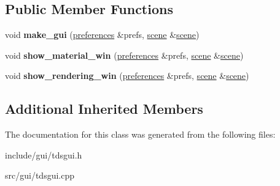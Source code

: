 \subsection*{Public Member Functions}
\begin{DoxyCompactItemize}
\item 
\mbox{\label{classtds__gui_aeef0820d048e0ddae1746a3827f214aa}} 
void {\bfseries make\+\_\+gui} (\hyperlink{classpreferences}{preferences} \&prefs, \hyperlink{classscene}{scene} \&\hyperlink{classscene}{scene})
\item 
\mbox{\label{classtds__gui_acc096c8c649a262775502514f101001a}} 
void {\bfseries show\+\_\+material\+\_\+win} (\hyperlink{classpreferences}{preferences} \&prefs, \hyperlink{classscene}{scene} \&\hyperlink{classscene}{scene})
\item 
\mbox{\label{classtds__gui_ae161ae22a1916dcd0bc8d8bbc1814297}} 
void {\bfseries show\+\_\+rendering\+\_\+win} (\hyperlink{classpreferences}{preferences} \&prefs, \hyperlink{classscene}{scene} \&\hyperlink{classscene}{scene})
\end{DoxyCompactItemize}
\subsection*{Additional Inherited Members}


The documentation for this class was generated from the following files\+:\begin{DoxyCompactItemize}
\item 
include/gui/tdsgui.\+h\item 
src/gui/tdsgui.\+cpp\end{DoxyCompactItemize}

